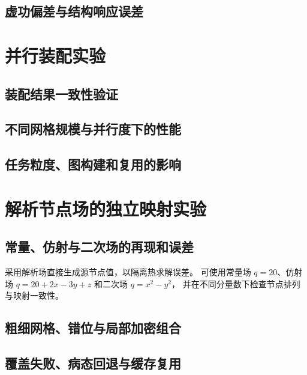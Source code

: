 \subsection{虚功偏差与结构响应误差}
\thesisdraftnote

\section{并行装配实验}
\subsection{装配结果一致性验证}
\thesisdraftnote

\subsection{不同网格规模与并行度下的性能}
\thesisdraftnote

\subsection{任务粒度、图构建和复用的影响}
\thesisdraftnote

\section{解析节点场的独立映射实验}
\subsection{常量、仿射与二次场的再现和误差}
采用解析场直接生成源节点值，以隔离热求解误差。
可使用常量场 $q=20$、仿射场 $q=20+2x-3y+z$ 和二次场 $q=x^2-y^2$，
并在不同分量数下检查节点排列与映射一致性。
\subsection{粗细网格、错位与局部加密组合}
\thesisdraftnote

\subsection{覆盖失败、病态回退与缓存复用}
\thesisdraftnote

